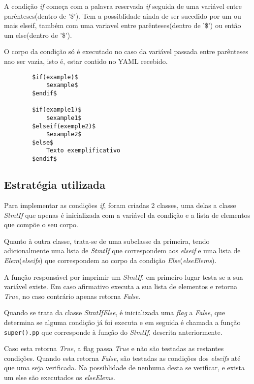 \documentclass[../relatorio.tex]{subfiles}
\begin{document}
    A condição \textit{if} começa com a palavra reservada \textit{if}
    seguida de uma variável entre parênteses(dentro de '\$'). Tem a
    possiblidade ainda de ser sucedido por um ou mais elseif, também com 
    uma variavel entre parênteses(dentro de '\$') ou então um else(dentro de '\$').
    
    O corpo da condição só é executado no caso da variável passada entre parênteses
    nao ser vazia, isto é, estar contido no YAML recebido.

    \begin{verbatim}
        $if(example)$
            $example$
        $endif$

        $if(example1)$
            $example1$
        $elseif(exemple2)$
            $example2$
        $else$
            Texto exemplificativo   
        $endif$
    \end{verbatim}

    \subsection*{Estratégia utilizada}

    Para implementar as condições \textit{if}, foram criadas 2 classes,
    uma delas a classe \textit{StmtIf} que apenas é inicializada com 
    a variável da condição e a lista de elementos que compõe o seu corpo.

    Quanto à outra classe, trata-se de uma subclasse da primeira, tendo 
    adicionalmente uma lista de \textit{StmtIf} que correspondem aos
    \textit{elseif} e uma lista de \textit{Elem}(\textit{elseifs}) que correspondem ao corpo
    da condição \textit{Else}(\textit{elseElems}). 

    A função responsável por imprimir um \textit{StmtIf}, em primeiro lugar testa se a sua 
    variável existe. Em caso afirmativo executa a sua lista de elementos e retorna \textit{True},
    no caso contrário apenas retorna \textit{False}. 
    
    Quando se trata da classe \textit{StmtIfElse}, é inicializada uma \textit{flag} a \textit{False},
    que determina se alguma condição já foi executa e em seguida é chamada a função 
    \texttt{super().pp} que corresponde à função do \textit{StmtIf}, descrita anteriormente.

    Caso esta retorna \textit{True}, a flag passa \textit{True} e não são testadas as restantes condições. 
    Quando esta retorna \textit{False}, são testadas as condições dos \textit{elseifs} até que uma seja verificada. 
    Na possiblidade de nenhuma desta se verificar, e exista um else são executados os \textit{elseElems}.

    
\end{document}
